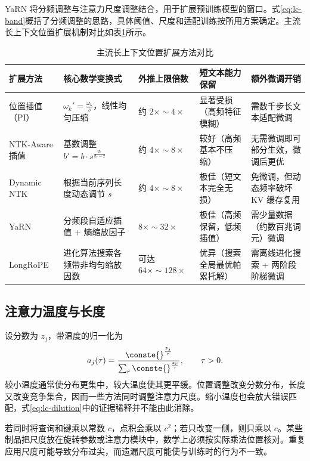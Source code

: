 \documentclass[../textbook.tex]{subfiles}
\begin{document}
YaRN 将分频调整与注意力尺度调整结合，用于扩展预训练模型的窗口\cite{peng2023yarn}。式\eqref{eq:lc-band}概括了分频调整的思路，具体阈值、尺度和适配训练按所用方案确定。主流长上下文位置扩展机制对比如表\ref{tab:lc-methods}所示。

\begin{table}[htbp]
\centering
\caption{主流长上下文位置扩展方法对比}\label{tab:lc-methods}
\begin{tabularx}{\linewidth}{lXXXX}
\toprule
扩展方法 & 核心数学变换式 & 外推上限倍数 & 短文本能力保留 & 额外微调开销\\\midrule
位置插值（PI） & $\omega_k' = \frac{\omega_k}{s}$，线性均匀压缩 & 约 $2\times \sim 4\times$ & 显著受损（高频特征模糊） & 需数千步长文本适配微调\\
NTK-Aware 插值 & 基数调整 $b' = b \cdot s^{\frac{d_r}{d_r-2}}$ & 约 $4\times \sim 8\times$ & 较好（高频基本不压缩） & 无需微调即可部分生效，微调后更优\\
Dynamic NTK & 根据当前序列长度动态调节 $s$ & 约 $4\times \sim 8\times$ & 极佳（短文本完全无损） & 免微调，但动态频率破坏 KV 缓存复用\\
YaRN & 分频段自适应插值 + 熵缩放因子 & $8\times \sim 32\times$ & 极佳（高频保留，低频插值） & 需少量数据（约数百兆词元）微调\\
LongRoPE & 进化算法搜索各频带非均匀缩放因数 & 可达 $64\times \sim 128\times$ & 优异（搜索全局最优帕累托解） & 需离线进化搜索 + 两阶段阶梯微调\\
\bottomrule
\end{tabularx}
\end{table}

\subsection{注意力温度与长度}
设分数为 $z_j$，带温度的归一化为
\begin{equation}
 a_j(\tau)=\frac{\conste{}^{\frac{z_j}{\tau}}}{\sum_r \conste{}^{\frac{z_r}{\tau}}},\qquad\tau>0.
\end{equation}
较小温度通常使分布更集中，较大温度使其更平缓。位置调整改变分数分布，长度又改变竞争集合，因而一些方法同时调整注意力尺度。缩小温度也会放大错误匹配，式\eqref{eq:lc-dilution}中的证据稀释并不能由此消除。

若同时将查询和键乘以常数 $c$，点积会乘以 $c^2$；若只改变一侧，则只乘以 $c$。某些制品把尺度放在旋转参数或注意力模块中，数学上必须按实际乘法位置核对。重复应用尺度可能导致分布过尖，而遗漏尺度可能使与训练时的行为不一致。
\end{document}
